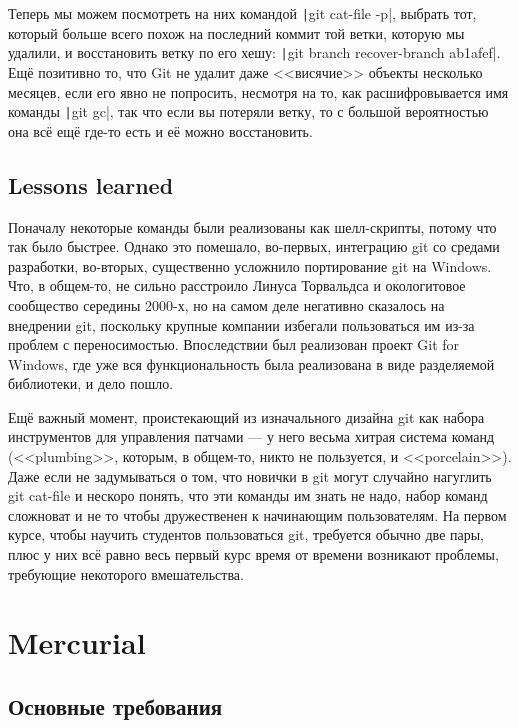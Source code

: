\documentclass{../../text-style}
\begin{document}
Теперь мы можем посмотреть на них командой \texttt|git cat-file -p|, выбрать тот, который больше всего похож на последний коммит той ветки, которую мы удалили, и восстановить ветку по его хешу: \texttt|git branch recover-branch ab1afef|. Ещё позитивно то, что Git не удалит даже <<висячие>> объекты несколько месяцев, если его явно не попросить, несмотря на то, как расшифровывается имя команды \texttt|git gc|, так что если вы потеряли ветку, то с большой вероятностью она всё ещё где-то есть и её можно восстановить.

\subsection{Lessons learned}

Поначалу некоторые команды были реализованы как шелл-скрипты, потому что так было быстрее. Однако это помешало, во-первых, интеграцию git со средами разработки, во-вторых, существенно усложнило портирование git на Windows. Что, в общем-то, не сильно расстроило Линуса Торвальдса и окологитовое сообщество середины 2000-х, но на самом деле негативно сказалось на внедрении git, поскольку крупные компании избегали пользоваться им из-за проблем с переносимостью. Впоследствии был реализован проект Git for Windows, где уже вся функциональность была реализована в виде разделяемой библиотеки, и дело пошло.

Ещё важный момент, проистекающий из изначального дизайна git как набора инструментов для управления патчами --- у него весьма хитрая система команд (<<plumbing>>, которым, в общем-то, никто не пользуется, и <<porcelain>>). Даже если не задумываться о том, что новички в git могут случайно нагуглить git cat-file и нескоро понять, что эти команды им знать не надо, набор команд сложноват и не то чтобы дружественен к начинающим пользователям. На первом курсе, чтобы научить студентов пользоваться git, требуется обычно две пары, плюс у них всё равно весь первый курс время от времени возникают проблемы, требующие некоторого вмешательства.

\section{Mercurial}

\subsection{Основные требования}
\end{document}
